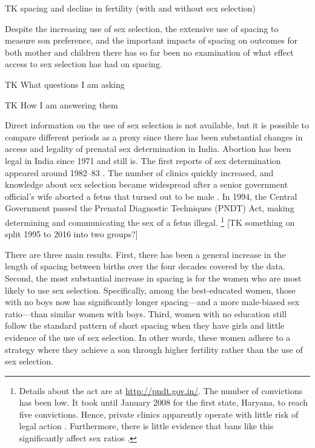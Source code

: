 \documentclass[12pt,letterpaper]{article}
\begin{document}
TK spacing and decline in fertility (with and without sex selection)

Despite the increasing use of sex selection, the extensive use of spacing to measure son 
preference, and the important impacts of spacing on outcomes for both mother and children  
there has so far been no examination of what effect access to sex selection has had on 
spacing.

TK What questions I am asking

TK How I am answering them


Direct information on the use of sex selection is not available, but it is possible
to compare different periods as a proxy since there has been substantial changes in access 
and legality of prenatal sex determination in India.
Abortion has been legal in India since 1971 and still is.
The first reports of sex determination appeared around 
1982--83 \citep{Sudha1999,bhat06,Grover2006}.
The number of clinics quickly increased, and knowledge about sex selection 
became widespread after a senior government official's wife aborted a 
fetus that turned out to be male \citep[p.\ 598]{Sudha1999}.
In 1994, the Central Government passed the Prenatal Diagnostic Techniques 
(PNDT) Act, making determining and communicating the sex of a fetus illegal.%
\footnote{
Details about the act are at \href{http://pndt.gov.in/}{http://pndt.gov.in/}.
The number of convictions has been low.
It took until January 2008 for the first state, Haryana, to reach five convictions.
Hence, private clinics apparently operate with little risk of legal action 
\citep{Sudha1999}.
Furthermore, there is little evidence that bans like this significantly
affect sex ratios \citep{Das-Gupta2016}.
}
[TK something on split 1995 to 2016 into two groups?]



There are three main results.
First, there has been a general increase in the length of spacing between births
over the four decades covered by the data.
Second, the most substantial increase in spacing is for the women who
are most likely to use sex selection.
Specifically, among the best-educated women, those with no boys now has 
significantly longer spacing---and a more male-biased sex ratio---than 
similar women with boys.
Third, women with no education still follow the standard pattern of
short spacing when they have girls and little evidence of the use of sex
selection.
In other words, these women adhere to a strategy where they achieve a
son through higher fertility rather than the use of sex selection.
\end{document}
